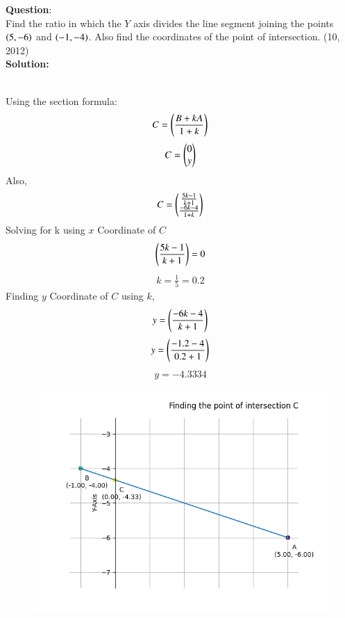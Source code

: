 \documentclass[journal]{IEEEtran}
\begin{document}
\textbf{Question}:\\
Find the ratio in which the $Y$ axis divides the line segment joining the points $\left(5, -6\right)$
and $\left(-1, -4\right)$. Also find the coordinates of the point of intersection. \hfill (10, 2012)
\\ \textbf{Solution: }\\
    \begin{table}[h!]    
      \centering
      
      \caption{}
    \end{table}\\
Using the section formula:
    \begin{align}
        C  = \left(\frac{B + kA}{1 + k}\right) \label{eq1.1.5.13.1}
    \end{align}
    \begin{align}
        C = \begin{pmatrix}0 \\ y\end{pmatrix} \label{eq1.1.5.13.2}
    \end{align}
Also,
    \begin{align}
        C = \begin{pmatrix}\frac{5k-1}{k+1} \\ \frac{-6k-4}{1+k}\end{pmatrix} \label{eq1.1.5.13.3}
    \end{align}
Solving for k using $x$ Coordinate of $C$
    \begin{align}
        \left(\frac{5k-1}{k+1}\right) = 0  \label{eq1.1.5.13.4}
    \end{align}
    \begin{align}
        k = \frac{1}{5} = 0.2\label{eq1.1.5.13.5}
    \end{align}
Finding $y$ Coordinate of $C$ using $k$,
    \begin{align}
        y = \left(\frac{-6k-4}{k+1}\right)  \label{eq1.1.5.13.6}
    \end{align}
    \begin{align}
        y = \left(\frac{-1.2-4}{0.2+1}\right) \label{eq1.1.5.13.7}
    \end{align}
    \begin{align}
        y = -4.3334 \label{eq1.1.5.13.8}
    \end{align}
    \begin{figure}[h]
        \centering
       \includegraphics[width=0.7\linewidth]{figs/fig1.png}
       \caption{}
       \label{graph}
    \end{figure}
\end{document}
